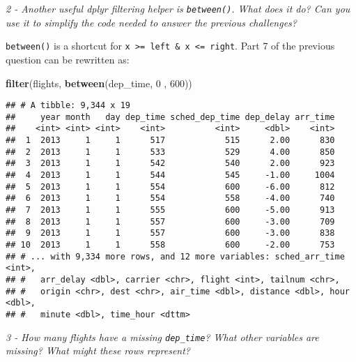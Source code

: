 \documentclass[]{article}
\newenvironment{Shaded}{\begin{snugshade}}{\end{snugshade}}
\newcommand{\KeywordTok}[1]{\textcolor[rgb]{0.13,0.29,0.53}{\textbf{#1}}}
\newcommand{\DecValTok}[1]{\textcolor[rgb]{0.00,0.00,0.81}{#1}}
\newcommand{\OperatorTok}[1]{\textcolor[rgb]{0.81,0.36,0.00}{\textbf{#1}}}
\newcommand{\NormalTok}[1]{#1}
\theoremstyle{definition}
\theoremstyle{definition}
\theoremstyle{definition}
\theoremstyle{remark}
\begin{document}
\emph{2 - Another useful dplyr filtering helper is \texttt{between()}.
What does it do? Can you use it to simplify the code needed to answer
the previous challenges?}

\texttt{between()} is a shortcut for
\texttt{x\ \textgreater{}=\ left\ \&\ x\ \textless{}=\ right}. Part 7 of
the previous question can be rewritten as:

\begin{Shaded}
\begin{Highlighting}[]
\KeywordTok{filter}\NormalTok{(flights, }\KeywordTok{between}\NormalTok{(dep_time, }\DecValTok{0}\NormalTok{ , }\DecValTok{600}\NormalTok{))}
\end{Highlighting}
\end{Shaded}

\begin{verbatim}
## # A tibble: 9,344 x 19
##     year month   day dep_time sched_dep_time dep_delay arr_time
##    <int> <int> <int>    <int>          <int>     <dbl>    <int>
##  1  2013     1     1      517            515      2.00      830
##  2  2013     1     1      533            529      4.00      850
##  3  2013     1     1      542            540      2.00      923
##  4  2013     1     1      544            545     -1.00     1004
##  5  2013     1     1      554            600     -6.00      812
##  6  2013     1     1      554            558     -4.00      740
##  7  2013     1     1      555            600     -5.00      913
##  8  2013     1     1      557            600     -3.00      709
##  9  2013     1     1      557            600     -3.00      838
## 10  2013     1     1      558            600     -2.00      753
## # ... with 9,334 more rows, and 12 more variables: sched_arr_time <int>,
## #   arr_delay <dbl>, carrier <chr>, flight <int>, tailnum <chr>,
## #   origin <chr>, dest <chr>, air_time <dbl>, distance <dbl>, hour <dbl>,
## #   minute <dbl>, time_hour <dttm>
\end{verbatim}

\emph{3 - How many flights have a missing \texttt{dep\_time}? What other
variables are missing? What might these rows represent?}

\begin{Shaded}
\end{Shaded}
\end{document}
